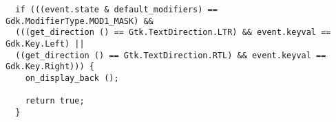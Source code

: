 \documentclass[12pt]{report}
\begin{document}
\begin{verbatim}
  if (((event.state & default_modifiers) == Gdk.ModifierType.MOD1_MASK) &&
  (((get_direction () == Gtk.TextDirection.LTR) && event.keyval == Gdk.Key.Left) ||
  ((get_direction () == Gtk.TextDirection.RTL) && event.keyval == Gdk.Key.Right))) {
    on_display_back ();

    return true;
  }
\end{verbatim}







\end{document}
